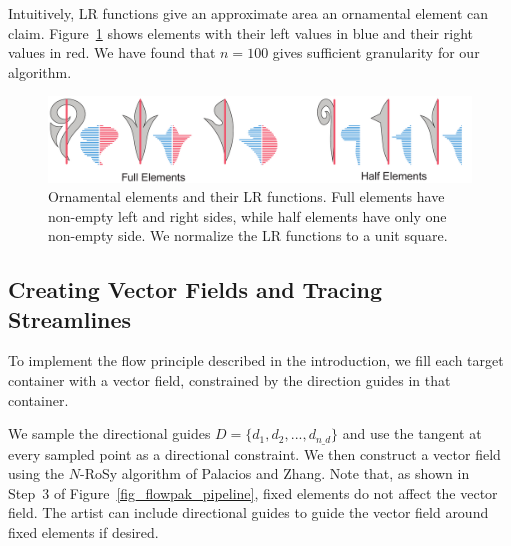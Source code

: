 Intuitively, LR functions give an approximate area an ornamental element can claim.
Figure~\ref{ornamental_shapes_fig} 
shows elements with their left values
in blue and their right values in red. We have found that $n = 100$ gives sufficient
granularity for our algorithm.

\begin{figure}
\centering
\includegraphics[width=1.0\textwidth]{figures/flowpak/ornaments.pdf}
\caption[Ornamental elements and their LR functions]
{\label{ornamental_shapes_fig}
Ornamental elements and their LR functions. Full elements have non-empty
left and right sides, while half elements have only one non-empty side. 
We normalize the LR functions to a unit square.}
\end{figure}

\subsection{Creating Vector Fields and Tracing Streamlines}
\label{flowpak_creating_vector_fields_and_tracing_streamlines}

To implement the flow principle described in the introduction, we fill each target
container with a vector field, constrained by the direction guides in that container.

We sample the directional guides $D = \{ d_{1}, d_{2}, ... , d_{n\text{\_}d}\}$  
and use the tangent at every sampled point as a directional constraint.
We then construct a vector field using the $N$-RoSy algorithm
of Palacios and Zhang\cite{Palacios2007}.  Note that, as shown in 
Step~3 of Figure~\ref{fig_flowpak_pipeline},
fixed elements do not affect the vector field.  
The artist can include directional guides to guide the vector field around fixed elements if desired.

